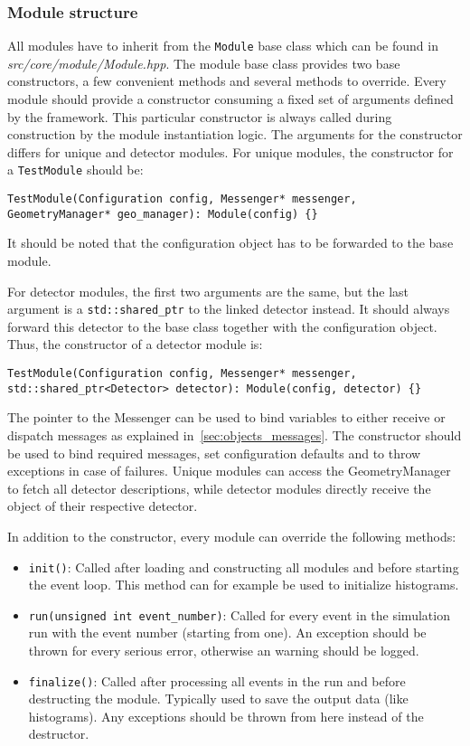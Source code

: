 \subsubsection{Module structure}
\label{sec:module_structure}
All modules have to inherit from the \texttt{Module} base class which can be found in \textit{src/core/module/Module.hpp}.
The module base class provides two base constructors, a few convenient methods and several methods to override.
Every module should provide a constructor consuming a fixed set of arguments defined by the framework.
This particular constructor is always called during construction by the module instantiation logic.
The arguments for the constructor differs for unique and detector modules.
For unique modules, the constructor for a \texttt{TestModule} should be:
\begin{verbatim}
TestModule(Configuration config, Messenger* messenger, GeometryManager* geo_manager): Module(config) {}
\end{verbatim}
It should be noted that the configuration object has to be forwarded to the base module.

For detector modules, the first two arguments are the same, but the last argument is a \texttt{std::shared\_ptr} to the linked detector instead.
It should always forward this detector to the base class together with the configuration object.
Thus, the constructor of a detector module is:
\begin{verbatim}
TestModule(Configuration config, Messenger* messenger, std::shared_ptr<Detector> detector): Module(config, detector) {}
\end{verbatim}

The pointer to the Messenger can be used to bind variables to either receive or dispatch messages as explained in~\ref{sec:objects_messages}.
The constructor should be used to bind required messages, set configuration defaults and to throw exceptions in case of failures.
Unique modules can access the GeometryManager to fetch all detector descriptions, while detector modules directly receive the object of their respective detector.

In addition to the constructor, every module can override the following methods:
\begin{itemize}
\item \texttt{init()}: Called after loading and constructing all modules and before starting the event loop.
This method can for example be used to initialize histograms.
\item \texttt{run(unsigned int event\_number)}: Called for every event in the simulation run with the event number (starting from one).
An exception should be thrown for every serious error, otherwise an warning should be logged.
\item \texttt{finalize()}: Called after processing all events in the run and before destructing the module.
Typically used to save the output data (like histograms).
Any exceptions should be thrown from here instead of the destructor.
\end{itemize}


